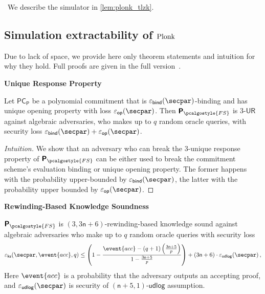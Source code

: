 \documentclass[10pt]{llncs}
\newcommand{\pcvarstyle}[1]{\mathsf{#1}}
\newcommand{\ncase}[1]{\medskip\noindent{\textbf{#1:}}}
\newcommand{\numberofconstrains}{\pcvarstyle{n}}
\newcommand{\noofc}{\numberofconstrains}
\newcommand{\eps}{\varepsilon}
\newcommand{\srs}{\pcvarstyle{srs}}
\newcommand{\td}{\pcvarstyle{td}}
\newcommand{\fs}{\pcalgostyle{FS}}
\newcommand{\pcschemestyle}[1]{\bm{\mathsf{#1}}}
\newcommand{\plonkprot}{\pcschemestyle{P}}
\newcommand{\plonkprotfs}{\pcschemestyle{P}_\fs}
\newcommand{\inp}{\pcvarstyle{x}}
\newcommand{\accProb}{\event{acc}}
\newcommand{\PCOMp}{\pcschemestyle{PC}_{\plonkprot}}
\newcommand{\ur}[1]{{#1\text{-}\mathsf{UR}}}
\newcommand{\plonk}{\ensuremath{\textnormal{{Plonk}}}}
\newcommand{\udlog}{\pcvarstyle{udlog}}
\newcommand{\epsbind}{\eps_\pcvarstyle{bind}}
\newcommand{\epsbinding}{\eps_\pcvarstyle{bind}}
\newcommand{\epsid}{\eps_{\pcvarstyle{id}}}
\newcommand{\epsop}{\eps_\pcvarstyle{op}}
\newcommand{\epsudlog}{\eps_\udlog}
\newcommand{\epscss}{\eps_{\pcvarstyle{ks}}}
\newcommand{\oursubsub}[1] {\smallskip\noindent\textbf{#1}}
\begin{document}
\ncase{Plonk simulator $\simulator_\chi(\srs, \td= \chi, \inp)$}\ 
We describe the simulator in \cref{lem:plonk_tlzk}.

\subsection{Simulation extractability of $\plonk${}}
Due to lack of space, we provide here only theorem statements and intuition for why they hold. Full proofs are given in the full version~\cite{EPRINT:GKKNZ21}.

\oursubsub{Unique Response Property}
\begin{lemma}
	\label{lem:plonkprot_ur}
	Let $\PCOMp$ be a polynomial commitment that is $\epsbind(\secpar)$-binding and has unique opening property with loss $\epsop (\secpar)$. Then $\plonkprotfs$ is $\ur{3}$ against algebraic adversaries, who makes up to $q$ random oracle queries, with security loss $\epsbinding (\secpar) + \epsop ( \secpar )$.
\end{lemma}
\begin{proof}[Intuition]
	We show that an adversary who can break the $3$-unique response property of $\plonkprotfs$ can be either used to break the commitment scheme's evaluation binding or unique opening property. The former happens with the probability upper-bounded by $\epsbinding (\secpar)$, the latter with the probability upper bounded by $\epsop (\secpar)$. 
	
\end{proof}

\oursubsub{Rewinding-Based Knowledge Soundness}
\begin{lemma}
	\label{lem:plonkprot_ss}
	$\plonkprotfs$ is $(3, 3 \noofc + 6)$-rewinding-based knowledge sound against algebraic adversaries who make up to $q$ random oracle queries with security loss 
	\[
	\epscss(\secpar,\accProb, q) \leq \left(1 - \frac{\accProb - (q + 1) \left(\frac{3 \noofc + 5}{p} \right)}{1 - \frac{3 \noofc + 5}{p}}\right) + (3 \noofc + 6) \cdot \epsudlog (\secpar) %
	\,,
	\]
	Here $\accProb$ is a probability that the adversary outputs an accepting proof, 
	and $\epsudlog(\secpar)$ is security of $(\numberofconstrains + 5, 1)$-$\udlog$ 
	assumption.
\end{lemma}
\end{document}

